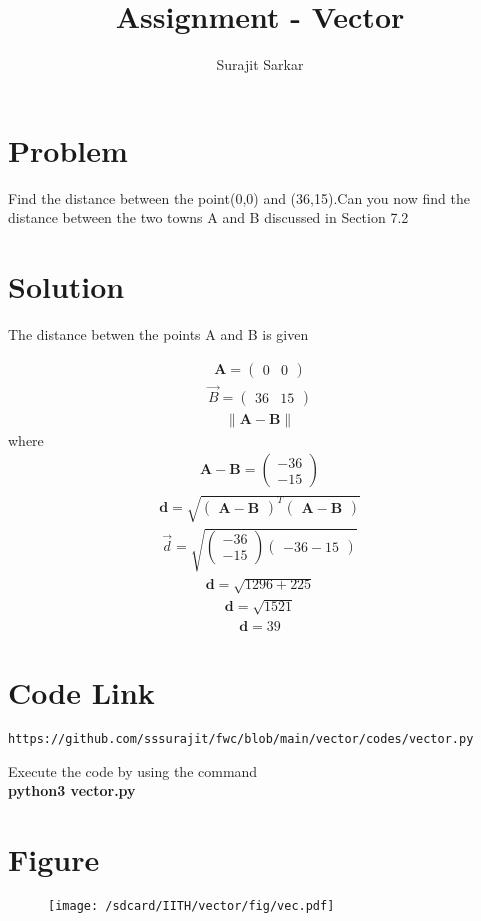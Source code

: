 \documentclass[journal,12pt,twocolumn]{IEEEtran}
\title{\mytitle}
\title{
Assignment - Vector
}
\author{Surajit Sarkar}
\newcommand{\myvec}[1]{\ensuremath{\begin{pmatrix}#1\end{pmatrix}}}
\providecommand{\norm}[1]{\lVert#1\rVert}
\let\vec\mathbf
\begin{document}
\maketitle
\tableofcontents
\bigskip
\section{\textbf{Problem}}
Find the distance between the point(0,0) and (36,15).Can you now find the distance between the two towns A and B discussed in Section 7.2
\section{\textbf{Solution}}
The distance betwen the points A and B is given


\begin{align*}
       \vec A=\myvec{0 & 0}
\end{align*}   
\begin{align*}
       \Vec B=\myvec{36 & 15}
 \end{align*}
 \begin{align*}
     \norm{\vec{A-B}}
 \end{align*}
       where 
 \begin{align*}
     \vec {A-B}=\myvec{-36\\-15}
 \end{align*}      
\begin{align*}
    \vec d=\sqrt{\myvec{\vec {A-B}}^T\myvec{\vec {A-B}}}
\end{align*}
\begin{align*}
    \Vec d =\sqrt{\myvec{-36\\-15}{\myvec{-36-15}}}
\end{align*}
\begin{align*}
    \vec d=\sqrt{1296+225}
\end{align*}
\begin{align*}
    \vec d=\sqrt{1521}
\end{align*}
\begin{align*}
    \vec d=39
\end{align*}
\section{\textbf{Code Link}}
\begin{lstlisting}
https://github.com/sssurajit/fwc/blob/main/vector/codes/vector.py
\end{lstlisting}
Execute the code by using the command\\
\textbf{python3 vector.py}
\section{\textbf{Figure}}
\begin{figure}[!h]
    \centering
\texttt{[image: /sdcard/IITH/vector/fig/vec.pdf]}
\captionsetup{labelformat=empty}
\caption{}
\label{fig:vec}
\end{figure}
\end{document}
